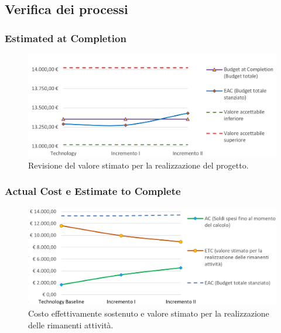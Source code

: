 \subsection{Verifica dei processi}

\subsubsection{Estimated at Completion}
\begin{figure}[h]
	\centering
	\includegraphics[width=17cm]{Images/BAC-EAC}
	\caption{Revisione del valore stimato per la realizzazione del progetto.}
\end{figure}

\newpage

\subsubsection{Actual Cost e Estimate to Complete}
\begin{figure}[h]
	\centering
	\includegraphics[width=16cm]{Images/ETC-AC}
	\caption{Costo effettivamente sostenuto e valore stimato per la realizzazione delle rimanenti attività.}
\end{figure}


